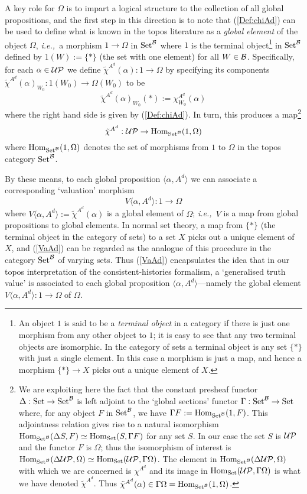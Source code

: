 \documentclass[12pt]{article}
\newcounter{def-number}[section]
\newcommand{\beq}{\begin{equation}}
\newcommand{\eeq}{\end{equation}}
\newcommand{\eq}[1]{(\ref{#1})}
\newcommand{\ie}{{\em i.e.,\ }}
\renewcommand{\a}{\alpha}                   %
\newcommand{\gp}[2]{\langle#1,#2\rangle}
\newcommand{\map}{\rightarrow}
\newcommand{\B}{{\cal B}}
\newcommand{\G}{\Gamma}
\newcommand{\Hom}{\mbox{Hom}}
\newcommand{\Om}{\Omega}
\newcommand{\UP}{{\cal UP}}
\newcommand{\Set}{{\rm Set}}
\newcommand{\SetB}{{\Set^{\cal B}}}
\begin{document}
	A key role for $\Om$ is to impart a logical structure to the
collection of all global propositions, and the first step in this
direction is to note that \eq{Def:chiAd} can be used to define what
is known in the topos literature as a {\em global element\/} of the
object $\Om$, \ie a morphism $1\map\Om$ in $\SetB$ where $1$ is the
terminal object\footnote{An object $1$ is said to be a {\em terminal
object\/} in a category if there is just one morphism from any other
object to $1$; it is easy to see that any two terminal objects are
isomorphic. In the category of sets a terminal object is any set
$\{*\}$ with just a single element.  In this case a morphism is just
a map, and hence a morphism $\{*\}\map X$ picks out a unique element
of $X$.} in $\SetB$ defined by $1(W):=\{*\}$ (the set with one
element) for all $W\in\B$.  Specifically, for each $\a\in\UP$ we
define $\tilde\chi^{A^d}(\a):1\map\Om$ by specifying its components
$\tilde\chi^{A^d}(\a)_{W_0}:1(W_0)\map\Om(W_0)$ to be
\beq
	\tilde\chi^{A^d}(\a)_{W_0}(*):=\chi^{A^d}_{W_0}(\a)
									\label{tilde-chiAda=}
\eeq
where the right hand side is given by \eq{Def:chiAd}. In turn, this
produces a map\footnote{We are exploiting here the fact that the constant
presheaf functor $\Delta:\Set\map\SetB$ is left adjoint
to the `global sections' functor
$\G:\SetB\map\Set$ where, for any object $F$ in $\SetB$, we have $\G
F:=\Hom_\SetB(1,F)$. This adjointness relation gives rise to a
natural isomorphism $\Hom_\SetB(\Delta S,F)
\simeq \Hom_\Set(S,\G F)$ for any set $S$. In our case the set $S$ is
$\UP$ and the functor $F$ is $\Om$; thus the isomorphism of interest is
$\Hom_\SetB(\Delta\UP,\Om)\simeq\Hom_\Set(\UP,\G\Om)$. The element in
$\Hom_\SetB(\Delta\UP,\Om)$ with which we are concerned is $\chi^{A^d}$
and its image in $\Hom_\Set(\UP,\G\Om)$ is what we have denoted
$\tilde\chi^{A^d}$. Thus $\tilde\chi^{A^d}(\a)\in\G\Om=\Hom_\SetB(1,\Om)$.}
\beq
		\tilde\chi^{A^d}:\UP\map\Hom_\SetB(1,\Omega)
									\label{tilde-chiAd}
\eeq 
where $\Hom_\SetB(1,\Omega)$ denotes the set of morphisms from $1$
to $\Om$ in the topos category $\SetB$.

	By these means, to each global proposition $\gp{\a}{A^d}$
we can associate a corresponding `valuation' morphism
\beq
		V\gp{\a}{A^d}:1\map\Om		\label{VaAd}
\eeq
where $V\gp{\a}{A^d}:=\tilde\chi^{A^d}(\a)$ is a global element of
$\Om$; \ie $V$ is a map from global propositions to global elements.
In normal set theory, a map from $\{*\}$ (the terminal object in the
category of sets) to a set $X$ picks out a unique element of $X$,
and \eq{VaAd} can be regarded as the analogue of this procedure in
the category $\SetB$ of varying sets.  Thus \eq{VaAd} encapsulates
the idea that in our topos interpretation of the
consistent-histories formalism, a `generalised truth value' is
associated to each global proposition $\gp{\a}{A^d}$---namely the
global element $V\gp{\a}{A^d}:1\map\Om$ of $\Om$.
\end{document}
